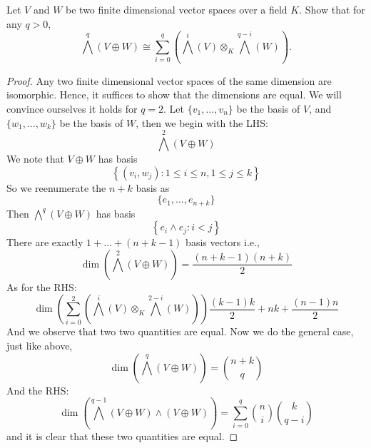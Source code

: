 \begin{prob}[S2016-Q4]
    Let \(V\) and \(W\) be two finite dimensional vector spaces over a field \(K\). Show that for any \(q>0\),
    \[\bigwedge^{q}(V\oplus W)\cong\sum_{i=0}^{q}(\bigwedge^{i}(V)\otimes_{K}\bigwedge^{q-i}(W)).\]
\end{prob}
\begin{proof}
    Any two finite dimensional vector spaces of the same dimension are isomorphic. Hence, it suffices to show that the dimensions are equal. We will convince ourselves it holds for $q=2$. Let $\{v_1,\dots, v_n\}$ be the basis of $V$, and $\{w_1,\dots,w_k\}$ be the basis of $W$, then we begin with the LHS:
    \begin{equation*}
        \bigwedge^{2}(V\oplus W)
    \end{equation*}
    We note that $V\oplus W$ has basis 
    \begin{equation*}
        \left\{(v_i,w_j):1\leq i\leq n, 1\leq j\leq k\right\}
    \end{equation*}
    So we reenumerate the $n+k$ basis as 
    \begin{equation*}
        \{e_1,\dots, e_{n+k}\}
    \end{equation*}
    Then $\bigwedge^{q}(V\oplus W)$ has basis
    \begin{equation*}
        \left\{ e_i\wedge e_j: i<j\right\}
    \end{equation*}
    There are exactly $1+\dots+(n+k-1)$ basis vectors i.e.,
    \begin{equation*}
        \dim\left(\bigwedge^{2}(V\oplus W)\right)=\frac{(n+k-1)(n+k)}{2}
    \end{equation*}
    As for the RHS: 
    \begin{equation*}
        \dim\left( \sum_{i=0}^{2}(\bigwedge^{i}(V)\otimes_{K}\bigwedge^{2-i}(W))\right)
        \frac{(k-1)k}{2}+nk+\frac{(n-1)n}{2}
    \end{equation*}
    And we observe that two two quantities are equal. Now we do the general case, just like above, 
    \begin{equation*}
        \dim\left(\bigwedge^{q}(V\oplus W)\right)=\binom{n+k}{q}
    \end{equation*}
    And the RHS:
    \begin{equation*}
        \dim\left(\bigwedge^{q-1}(V\oplus W)\wedge (V\oplus W)\right)=\sum_{i=0}^q\binom{n}{i}\binom{k}{q-i}
    \end{equation*}
    and it is clear that these two quantities are equal.
\end{proof}



